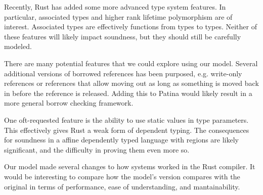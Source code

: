 Recently, Rust has added some more advanced type system features.
In particular, associated types and higher rank lifetime polymorphism are of interest.
Associated types are effectively functions from types to types.
Neither of these features will likely impact soundness, 
but they should still be carefully modeled.

There are many potential features that we could explore using our model.
Several additional versions of borrowed references has been purposed,
e.g. write-only references or references that allow moving out as long as something
is moved back in before the reference is released. Adding this to Patina would likely
result in a more general borrow checking framework.

One oft-requested feature is the ability to use static values in type parameters.
This effectively gives Rust a weak form of dependent typing.
The consequences for soundness in a affine dependently typed language with regions
are likely significant, and the difficulty in proving them even more so.

Our model made several changes to how systems worked in the Rust compiler.
It would be interesting to compare how the model's version compares with the original
in terms of performance, ease of understanding, and mantainability.
